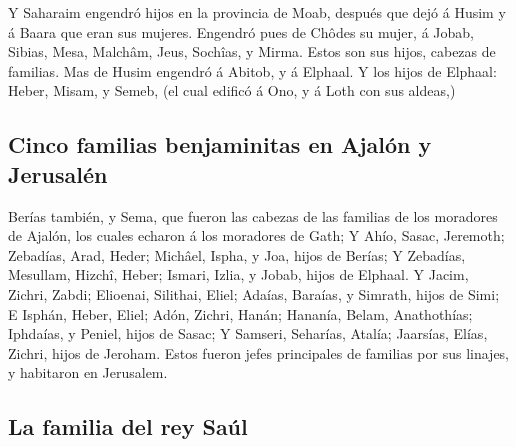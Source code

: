  Y Saharaim engendró hijos en la provincia de Moab,
después que dejó á Husim y á Baara que eran sus mujeres. 
Engendró pues de Chôdes su mujer, á Jobab, Sibias, Mesa, Malchâm,
 Jeus, Sochîas, y Mirma. Estos son sus hijos, cabezas de
familias.  Mas de Husim engendró á Abitob, y á Elphaal.
 Y los hijos de Elphaal: Heber, Misam, y Semeb, (el cual
edificó á Ono, y á Loth con sus aldeas,)

\hypertarget{cinco-familias-benjaminitas-en-ajaluxf3n-y-jerusaluxe9n}{%
\subsection{Cinco familias benjaminitas en Ajalón y
Jerusalén}\label{cinco-familias-benjaminitas-en-ajaluxf3n-y-jerusaluxe9n}}

 Berías también, y Sema, que fueron las cabezas de las
familias de los moradores de Ajalón, los cuales echaron á los moradores
de Gath;  Y Ahío, Sasac, Jeremoth; 
Zebadías, Arad, Heder;  Michâel, Ispha, y Joa, hijos de
Berías;  Y Zebadías, Mesullam, Hizchî, Heber;
 Ismari, Izlia, y Jobab, hijos de Elphaal.
 Y Jacim, Zichri, Zabdi;  Elioenai,
Silithai, Eliel;  Adaías, Baraías, y Simrath, hijos de
Simi;  E Isphán, Heber, Eliel;  Adón,
Zichri, Hanán;  Hananía, Belam, Anathothías;
 Iphdaías, y Peniel, hijos de Sasac;  Y
Samseri, Seharías, Atalía;  Jaarsías, Elías, Zichri,
hijos de Jeroham.  Estos fueron jefes principales de
familias por sus linajes, y habitaron en Jerusalem.

\hypertarget{la-familia-del-rey-sauxfal}{%
\subsection{La familia del rey Saúl}\label{la-familia-del-rey-sauxfal}}

